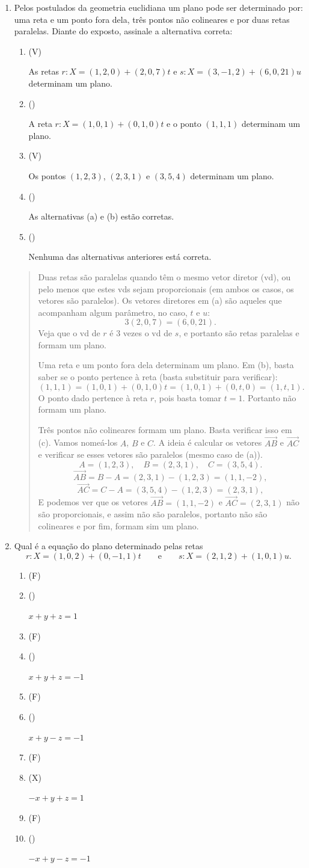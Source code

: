 \documentclass[12pt,a4paper]{article}
\newenvironment{ans}{\color{blue}\begin{quote}}{\end{quote}}
\newif \ifans
\newif \ifvf
\newcommand{\alt}{
	\ifvf
		\ifans
			\item({\sf\color{ForestGreen}V})
		\else 
			\item({\sf\color{Orange}F}) 
		\fi
	\else
		\ifans
			\item({\sf\color{Cyan}X})
		\else 
			\item({\sf\phantom{X}}) 
		\fi	
	\fi	
	\ansfalse
	\vffalse
}
\def\X{\anstrue}
\def\V{\vftrue\anstrue}
\def\F{\vftrue}
\begin{document}
\begin{enumerate}
\item Pelos  postulados da geometria euclidiana um plano pode ser determinado por: uma reta e um ponto fora dela, três pontos não colineares e por duas retas paralelas. Diante do exposto, assinale a alternativa correta:
	\begin{enumerate}
	\V\alt As retas $r:X=(1,2,0)+(2,0,7)t$ e $s:X=(3,-1,2)+(6,0,21)u$ determinam um plano.
	\F\alt A reta $r:X=(1,0,1)+(0,1,0)t$ e o ponto $(1,1,1)$ determinam um plano.
	\V\alt Os pontos $(1,2,3)$, $(2,3,1)$ e $(3,5,4)$ determinam um plano.
	\F\alt As alternativas (a) e (b) estão corretas.
	\F\alt Nenhuma das alternativas anteriores está correta.
	\end{enumerate}
	
	\begin{ans}
	Duas retas são paralelas quando têm o mesmo vetor diretor (vd), ou pelo menos que estes vds sejam proporcionais (em ambos os casos, os vetores são paralelos). Os vetores diretores em (a) são aqueles que acompanham algum parâmetro, no caso, $t$ e $u$:
	\[
	3(2,0,7)=(6,0,21).
	\]
	Veja que o vd de $r$ é $3$ vezes o vd de $s$, e portanto são retas paralelas e formam um plano.
	
	Uma reta e um ponto fora dela determinam um plano. Em (b), basta saber se o ponto pertence à reta (basta substituir para verificar):
	\[
	(1,1,1) = (1,0,1)+(0,1,0)t=(1,0,1)+(0,t,0)=(1,t,1).
	\]
	O ponto dado pertence à reta $r$, pois basta tomar $t=1$. Portanto não formam um plano.
	
	Três pontos não colineares formam um plano. Basta verificar isso em (c). Vamos nomeá-los $A$, $B$ e $C$. A ideia é calcular os vetores $\overrightarrow{AB}$ e $\overrightarrow{AC}$ e verificar se esses vetores são paralelos (mesmo caso de (a)).
	\[
	A=(1,2,3), \quad B=(2,3,1),\quad C=(3,5,4).
	\]
	\[
	\overrightarrow{AB} = B-A=(2,3,1)-(1,2,3)=(1,1,-2), 
	\]
	\[
	\overrightarrow{AC} = C-A=(3,5,4)-(1,2,3)=(2,3,1),
	\]
	E podemos ver que os vetores $\overrightarrow{AB}=(1,1,-2)$ e $\overrightarrow{AC}=(2,3,1)$  não são proporcionais, e assim não são paralelos, portanto não são colineares e por fim, formam sim um plano.
	\end{ans}
	
	
	
	
	
	
	
	
\item Qual é a equação do plano determinado pelas retas
	\[
	r:X=(1,0,2) + (0,-1,1)t \qquad \text{e} \qquad 
	s:X=(2,1,2) + (1,0,1)u.
	\]
	\begin{enumerate}
	\alt $x+y+z=1$
	\alt $x+y+z=-1$
	\alt $x+y-z=-1$
	\X\alt $-x+y+z=1$
	\alt $-x+y-z=-1$
	\end{enumerate}
	

\end{enumerate}
\end{document}
